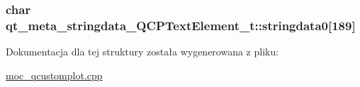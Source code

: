 \subsubsection[{\texorpdfstring{stringdata0}{stringdata0}}]{\setlength{\rightskip}{0pt plus 5cm}char qt\+\_\+meta\+\_\+stringdata\+\_\+\+Q\+C\+P\+Text\+Element\+\_\+t\+::stringdata0\mbox{[}189\mbox{]}}\hypertarget{structqt__meta__stringdata___q_c_p_text_element__t_a7307363ad48472f7f131b7b59640d43b}{}\label{structqt__meta__stringdata___q_c_p_text_element__t_a7307363ad48472f7f131b7b59640d43b}


Dokumentacja dla tej struktury została wygenerowana z pliku\+:\begin{DoxyCompactItemize}
\item 
\hyperlink{moc__qcustomplot_8cpp}{moc\+\_\+qcustomplot.\+cpp}\end{DoxyCompactItemize}

